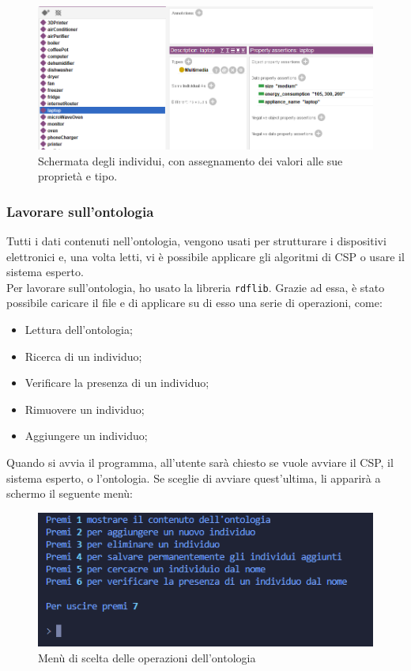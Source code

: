 \documentclass[12pt, letterpaper]{article}
\begin{document}
\begin{figure}[h]
      \centering
      \includegraphics[scale=0.6]{individui-protege.png}
      \caption{Schermata degli individui, con assegnamento dei valori alle sue proprietà e tipo.}
\end{figure}

\subsubsection{Lavorare sull'ontologia}

Tutti i dati contenuti nell'ontologia, vengono usati per strutturare i dispositivi elettronici e, una volta
letti, vi è possibile applicare gli algoritmi di CSP o usare il sistema esperto. \\

\noindent Per lavorare sull'ontologia, ho usato la libreria \texttt{rdflib}. Grazie ad essa, è stato possibile
caricare il file  e di applicare su di esso una serie di operazioni, come:

\begin{itemize}
      \item Lettura dell'ontologia;
      \item Ricerca di un individuo;
      \item Verificare la presenza di un individuo;
      \item Rimuovere un individuo;
      \item Aggiungere un individuo;
\end{itemize}

\noindent Quando si avvia il programma, all'utente sarà chiesto se vuole avviare il CSP, il sistema
esperto, o l'ontologia. Se sceglie di avviare quest'ultima, li apparirà a schermo il seguente menù: \\

\begin{figure}[h]
      \centering
      \includegraphics{ontologia-menu.png}
      \caption{Menù di scelta delle operazioni dell'ontologia}
\end{figure}
\end{document}
